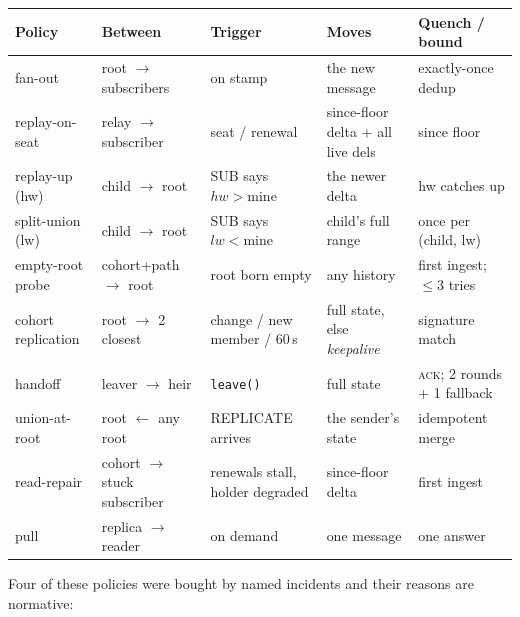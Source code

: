 \documentclass[nobib]{tufte-handout}
\begin{document}
\begin{table}[h]
\scriptsize
\begin{tabular}{@{}lllll@{}}
\toprule
Policy & Between & Trigger & Moves & Quench / bound \\
\midrule
fan-out & root $\to$ subscribers & on stamp & the new message & exactly-once dedup \\
replay-on-seat & relay $\to$ subscriber & seat / renewal & since-floor delta + all live dels & since floor \\
replay-up (hw) & child $\to$ root & SUB says $hw > \mathrm{mine}$ & the newer delta & hw catches up \\
split-union (lw) & child $\to$ root & SUB says $lw < \mathrm{mine}$ & child's full range & once per (child, lw) \\
empty-root probe & cohort+path $\to$ root & root born empty & any history & first ingest; $\le$3 tries \\
cohort replication & root $\to$ 2 closest & change / new member / 60\,s & full state, else \emph{keepalive} & signature match \\
handoff & leaver $\to$ heir & \texttt{leave()} & full state & \textsc{ack}; 2 rounds + 1 fallback \\
union-at-root & root $\gets$ any root & REPLICATE arrives & the sender's state & idempotent merge \\
read-repair & cohort $\to$ stuck subscriber & renewals stall, holder degraded & since-floor delta & first ingest \\
pull & replica $\to$ reader & on demand & one message & one answer \\
\bottomrule
\end{tabular}
\end{table}

Four of these policies were bought by named incidents and their reasons
are normative:
\end{document}
